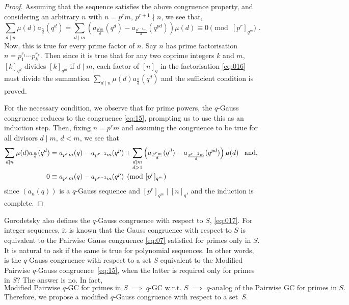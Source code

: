 \documentclass{article}
\numberwithin{equation}{section}
\theoremstyle{definition}
\begin{document}
\begin{proof}
    Assuming that the sequence satisfies the above congruence property, and considering an arbitrary $n$ with $n=p^rm$, $p^{r+1}\nmid n$, we see that,
    \[\sum_{d\mid n}\mu(d)a_\frac{n}{d}(q^d)=\sum_{d\mid m}\left(a_\frac{p^rm}{d}(q^d)-a_\frac{p^{r-1}m}{d}(q^{pd})\right)\mu(d)\equiv0\pmod{[p^r]_{q^m}}\text{ .}\]
 Now, this is true for every prime factor of $n$. Say $n$ has prime factorisation $n=p_1^{r_1}\cdots p_k^{r_k}$. Then since it is true that for any two coprime integers $k$ and $m$, $[k]_{q^d}$ divides $[k]_{q^m}$ if $d\mid m$, each factor of $[n]_q$ in the factorisation \eqref{eq:016} must divide the summation $\sum_{d\mid n}\mu(d)a_\frac{n}{d}(q^d)$ and the sufficient condition is proved.


 For the necessary condition, we observe that for prime powers, the $q$-Gauss congruence reduces to the congruence \eqref{eq:15}, prompting us to use this as an induction step. Then, fixing $n=p^rm$ and assuming the congruence to be true for all divisors $d\mid m$, $d<m$, we see that   
 \begin{align*}
     \sum_{d\mid n}\mu(d)a_\frac{n}{d}(q^d)&=a_{p^rm}(q)-a_{p^{r-1}m}(q^p)+\sum_{\substack{d\mid m\\d>1}}\left(a_\frac{p^rm}{d}(q^d)-a_\frac{p^{r-1}m}{d}(q^{pd})\right)\mu(d)\text{\hspace{3mm}and, }\\
     0&\equiv a_{p^rm}(q)-a_{p^{r-1}m}(q^p) \pmod{[p^r]_{q^m}}
 \end{align*}
 since $(a_n(q))$ is a $q$-Gauss sequence and $[p^r]_{q^m}\mid [n]_q$, and the induction is complete.
\end{proof}
Gorodetsky also defines the $q$-Gauss congruence with respect to $S$, \eqref{eq:017}. For integer sequences, it is known that the  Gauss congruence with respect to $S$ is equivalent to the Pairwise Gauss congruence \eqref{eq:07} satisfied for primes only in $S$. It is natural to ask if the same is true for polynomial sequences. In other words, is the $q$-Gauss congruence with respect to a set $S$ equivalent to the Modified Pairwise $q$-Gauss congruence~\eqref{eq:15}, when the latter is required only for primes in $S$? The answer is no. In fact,
\[
\text{Modified Pairwise $q$-GC for primes in $S$}
\;\implies\;
\text{$q$-GC w.r.t.\ $S$}
\;\implies\;
\text{$q$-analog of the Pairwise GC for primes in $S$}.
\]
Therefore, we propose a modified $q$-Gauss congruence with respect to a set~$S$.
\end{document}

